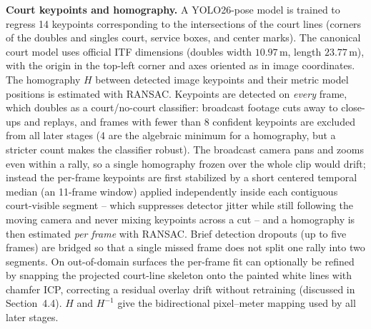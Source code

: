 \documentclass[10pt,twocolumn,a4paper]{article}
\begin{document}
	\textbf{Court keypoints and homography.} A YOLO26-pose model is trained to regress 14 keypoints corresponding to the intersections of the court lines (corners of the doubles and singles court, service boxes, and center marks). The canonical court model uses official ITF dimensions (doubles width $10.97$\,m, length $23.77$\,m), with the origin in the top-left corner and axes oriented as in image coordinates. The homography $H$ between detected image keypoints and their metric model positions is estimated with RANSAC. Keypoints are detected on \emph{every} frame, which doubles as a court/no-court classifier: broadcast footage cuts away to close-ups and replays, and frames with fewer than 8 confident keypoints are excluded from all later stages (4 are the algebraic minimum for a homography, but a stricter count makes the classifier robust). The broadcast camera pans and zooms even within a rally, so a single homography frozen over the whole clip would drift; instead the per-frame keypoints are first stabilized by a short centered temporal median (an 11-frame window) applied independently inside each contiguous court-visible segment -- which suppresses detector jitter while still following the moving camera and never mixing keypoints across a cut -- and a homography is then estimated \emph{per frame} with RANSAC. Brief detection dropouts (up to five frames) are bridged so that a single missed frame does not split one rally into two segments. On out-of-domain surfaces the per-frame fit can optionally be refined by snapping the projected court-line skeleton onto the painted white lines with chamfer ICP, correcting a residual overlay drift without retraining (discussed in Section~4.4). $H$ and $H^{-1}$ give the bidirectional pixel--meter mapping used by all later stages.
\end{document}
